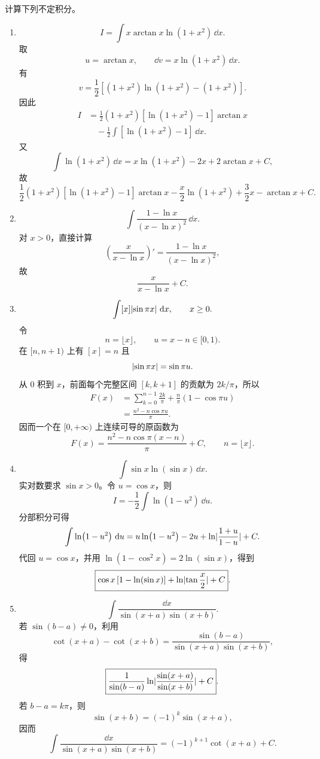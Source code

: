 \begin{xsolution}
计算下列不定积分。
  \begin{enumerate}[label=(\arabic*)]
    \item
    \[
      I=\int x\arctan x\ln(1+x^2)\,\dd x.
    \]
    取
    \[
      u=\arctan x,
      \qquad
      \dd v=x\ln(1+x^2)\,\dd x.
    \]
    有
    \[
      v=\frac12\left[(1+x^2)\ln(1+x^2)-(1+x^2)\right].
    \]
    因此
    \begin{align*}
      I
      &=\frac12(1+x^2)[\ln(1+x^2)-1]\arctan x\\
      &\quad-\frac12\int[\ln(1+x^2)-1]\,\dd x.
    \end{align*}
    又
    \[
      \int\ln(1+x^2)\,\dd x
      =x\ln(1+x^2)-2x+2\arctan x+C,
    \]
    故
    \[
      \boxed{
      \frac12(1+x^2)[\ln(1+x^2)-1]\arctan x
      -\frac x2\ln(1+x^2)+\frac32x-\arctan x+C}.
    \]

    \item
    \[
      \int\frac{1-\ln x}{(x-\ln x)^2}\,\dd x.
    \]
    对 $x>0$，直接计算
    \[
      \left(\frac{x}{x-\ln x}\right)'
      =\frac{1-\ln x}{(x-\ln x)^2},
    \]
    故
    \[
      \boxed{\frac{x}{x-\ln x}+C}.
    \]

    \item
    \[
      \int [x]\lvert\sin\pi x\rvert\,\mathop{}\!\mathrm{d} x,
      \qquad x\ge0.
    \]
    令
    \[
      n=\lfloor x\rfloor,
      \qquad
      u=x-n\in[0,1).
    \]
    在 $[n,n+1)$ 上有 $[x]=n$ 且
    \[
      \lvert\sin\pi x\rvert=\sin\pi u.
    \]
    从 $0$ 积到 $x$，前面每个完整区间 $[k,k+1]$ 的贡献为 $2k/\pi$，所以
    \begin{align*}
      F(x)
      &=\sum_{k=0}^{n-1}\frac{2k}{\pi}
        +\frac{n}{\pi}(1-\cos\pi u)\\
      &=\frac{n^2-n\cos\pi u}{\pi}.
    \end{align*}
    因而一个在 $[0,+\infty)$ 上连续可导的原函数为
    \[
      \boxed{
      F(x)=\frac{n^2-n\cos\pi(x-n)}{\pi}+C,
      \qquad n=\lfloor x\rfloor}.
    \]

    \item
    \[
      \int\sin x\ln(\sin x)\,\dd x.
    \]
    实对数要求 $\sin x>0$。令 $u=\cos x$，则
    \[
      I=-\frac12\int\ln(1-u^2)\,\dd u.
    \]
    分部积分可得
    \[
      \int\ln(1-u^2)\,\mathop{}\!\mathrm{d} u
      =u\ln(1-u^2)-2u+\ln\lvert\frac{1+u}{1-u}\rvert+C.
    \]
    代回 $u=\cos x$，并用 $\ln(1-\cos^2x)=2\ln(\sin x)$，得到
    \[
      \boxed{
      \cos x\,[1-\ln(\sin x)]
      +\ln\lvert\tan\frac x2\rvert+C}.
    \]

    \item
    \[
      \int\frac{\dd x}{\sin(x+a)\sin(x+b)}.
    \]
    若 $\sin(b-a)\ne0$，利用
    \[
      \cot(x+a)-\cot(x+b)
      =\frac{\sin(b-a)}{\sin(x+a)\sin(x+b)},
    \]
    得
    \[
      \boxed{
      \frac1{\sin(b-a)}
      \ln\lvert\frac{\sin(x+a)}{\sin(x+b)}\rvert+C}.
    \]
    若 $b-a=k\pi$，则
    \[
      \sin(x+b)=(-1)^k\sin(x+a),
    \]
    因而
    \[
      \boxed{
      \int\frac{\dd x}{\sin(x+a)\sin(x+b)}
      =(-1)^{k+1}\cot(x+a)+C}.
    \]


\end{enumerate}
\end{xsolution}
